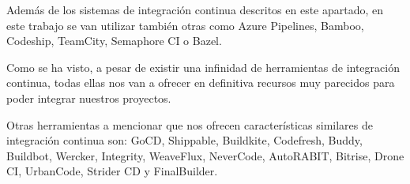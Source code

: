 

Además de los sistemas de integración continua descritos en este apartado, en este trabajo se van utilizar también otras como Azure Pipelines, Bamboo, Codeship, TeamCity, Semaphore CI o Bazel.

Como se ha visto, a pesar de existir una infinidad de herramientas de integración continua, todas ellas nos van a ofrecer en definitiva recursos muy parecidos para poder integrar nuestros proyectos.

Otras herramientas a mencionar que nos ofrecen características similares de integración continua son: GoCD, Shippable, Buildkite, Codefresh, Buddy, Buildbot, Wercker, Integrity, WeaveFlux, NeverCode, AutoRABIT, Bitrise, Drone CI, UrbanCode, Strider CD y FinalBuilder.
